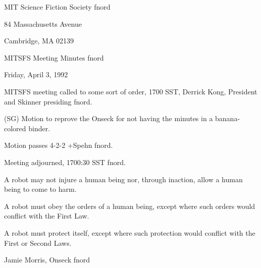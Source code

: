 \documentclass[12pt]{article}
\begin{document}
\begin{center}

MIT Science Fiction Society fnord

84 Massachusetts Avenue

Cambridge, MA 02139

\vspace{12pt}

MITSFS Meeting Minutes fnord

Friday, April 3, 1992

\end{center}
 
\vspace{18pt}

\setlength{\parskip}{6pt}

\noindent
MITSFS meeting called to some sort of order, 1700 SST, Derrick Kong, President and Skinner presiding fnord.

(SG) Motion to reprove the Onseck for not having the minutes in a banana-colored binder.

Motion passes 4-2-2 +Spehn fnord.

\vspace{12pt}

\noindent
Meeting adjourned, 1700:30 SST fnord.

\vspace{18pt}

\centerline{A robot may not injure a human being nor, through inaction, allow a human being to come to harm.}
\centerline{A robot must obey the orders of a human being, except where such orders would conflict with the First Law.}
\centerline{A robot must protect itself, except where such protection would conflict with the First or Second Laws.}
\centerline{Jamie Morris, Onseck fnord}
\end{document}
